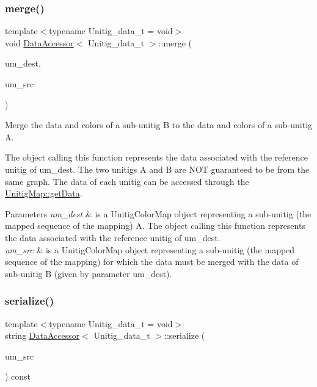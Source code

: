 \subsubsection{\texorpdfstring{merge()}{merge()}}
{\footnotesize\ttfamily template$<$typename Unitig\+\_\+data\+\_\+t  = void$>$ \\
void \hyperlink{classDataAccessor}{Data\+Accessor}$<$ Unitig\+\_\+data\+\_\+t $>$\+::merge (\begin{DoxyParamCaption}\item[{const \hyperlink{classUnitigMap}{Unitig\+Color\+Map}$<$ U $>$ \&}]{um\+\_\+dest,  }\item[{const \hyperlink{classUnitigMap}{const\+\_\+\+Unitig\+Color\+Map}$<$ U $>$ \&}]{um\+\_\+src }\end{DoxyParamCaption})}



Merge the data and colors of a sub-\/unitig B to the data and colors of a sub-\/unitig A. 

The object calling this function represents the data associated with the reference unitig of um\+\_\+dest. The two unitigs A and B are N\+OT guaranteed to be from the same graph. The data of each unitig can be accessed through the \hyperlink{classUnitigMap_a0c40fd1ba2df6af9a0c55b7963e41493}{Unitig\+Map\+::get\+Data}. 
\begin{DoxyParams}{Parameters}
{\em um\+\_\+dest} & is a Unitig\+Color\+Map object representing a sub-\/unitig (the mapped sequence of the mapping) A. The object calling this function represents the data associated with the reference unitig of um\+\_\+dest. \\
\hline
{\em um\+\_\+src} & is a Unitig\+Color\+Map object representing a sub-\/unitig (the mapped sequence of the mapping) for which the data must be merged with the data of sub-\/unitig B (given by parameter um\+\_\+dest). \\
\hline
\end{DoxyParams}
\mbox{\label{classDataAccessor_aae08bdd0b2c5d077672be826f112cfe1}} 
\subsubsection{\texorpdfstring{serialize()}{serialize()}}
{\footnotesize\ttfamily template$<$typename Unitig\+\_\+data\+\_\+t  = void$>$ \\
string \hyperlink{classDataAccessor}{Data\+Accessor}$<$ Unitig\+\_\+data\+\_\+t $>$\+::serialize (\begin{DoxyParamCaption}\item[{const \hyperlink{classUnitigMap}{const\+\_\+\+Unitig\+Color\+Map}$<$ U $>$ \&}]{um\+\_\+src }\end{DoxyParamCaption}) const}



